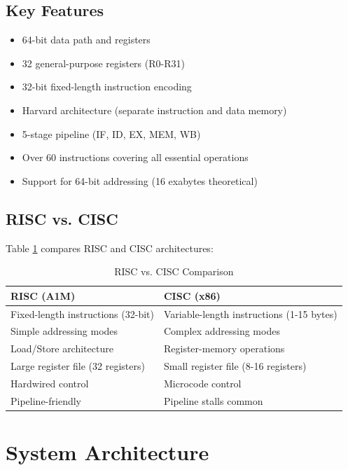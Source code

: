 \documentclass[12pt,a4paper,oneside]{book}
\begin{document}
\subsection{Key Features}

\begin{itemize}
    \item 64-bit data path and registers
    \item 32 general-purpose registers (R0-R31)
    \item 32-bit fixed-length instruction encoding
    \item Harvard architecture (separate instruction and data memory)
    \item 5-stage pipeline (IF, ID, EX, MEM, WB)
    \item Over 60 instructions covering all essential operations
    \item Support for 64-bit addressing (16 exabytes theoretical)
\end{itemize}

\subsection{RISC vs. CISC}

Table \ref{tab:risc-cisc} compares RISC and CISC architectures:

\begin{table}[H]
\centering
\caption{RISC vs. CISC Comparison}
\label{tab:risc-cisc}
\begin{tabularx}{\textwidth}{|X|X|}
\hline
\textbf{RISC (A1M)} & \textbf{CISC (x86)} \\
\hline
Fixed-length instructions (32-bit) & Variable-length instructions (1-15 bytes) \\
\hline
Simple addressing modes & Complex addressing modes \\
\hline
Load/Store architecture & Register-memory operations \\
\hline
Large register file (32 registers) & Small register file (8-16 registers) \\
\hline
Hardwired control & Microcode control \\
\hline
Pipeline-friendly & Pipeline stalls common \\
\hline
\end{tabularx}
\end{table}

\section{System Architecture}
\end{document}
